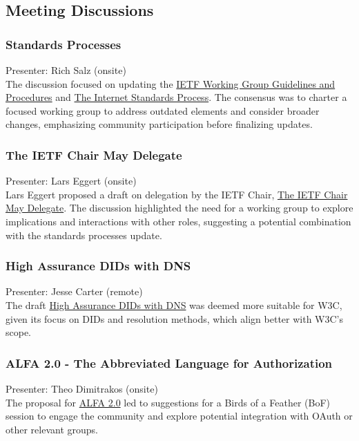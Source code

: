 \documentclass{article}
\begin{document}
\subsection{Meeting Discussions}

\subsubsection{Standards Processes}
Presenter: Rich Salz (onsite) \\
The discussion focused on updating the \href{https://datatracker.ietf.org/doc/html/draft-rsalz-2418bis}{IETF Working Group Guidelines and Procedures} and \href{https://datatracker.ietf.org/doc/html/draft-rsalz-2026bis}{The Internet Standards Process}. The consensus was to charter a focused working group to address outdated elements and consider broader changes, emphasizing community participation before finalizing updates.

\subsubsection{The IETF Chair May Delegate}
Presenter: Lars Eggert (onsite) \\
Lars Eggert proposed a draft on delegation by the IETF Chair, \href{https://datatracker.ietf.org/doc/html/draft-eggert-ietf-chair-may-delegate}{The IETF Chair May Delegate}. The discussion highlighted the need for a working group to explore implications and interactions with other roles, suggesting a potential combination with the standards processes update.

\subsubsection{High Assurance DIDs with DNS}
Presenter: Jesse Carter (remote) \\
The draft \href{https://datatracker.ietf.org/doc/html/draft-carter-high-assurance-dids-with-dns}{High Assurance DIDs with DNS} was deemed more suitable for W3C, given its focus on DIDs and resolution methods, which align better with W3C's scope.

\subsubsection{ALFA 2.0 - The Abbreviated Language for Authorization}
Presenter: Theo Dimitrakos (onsite) \\
The proposal for \href{https://datatracker.ietf.org/doc/html/draft-brossard-alfa-authz}{ALFA 2.0} led to suggestions for a Birds of a Feather (BoF) session to engage the community and explore potential integration with OAuth or other relevant groups.
\end{document}
